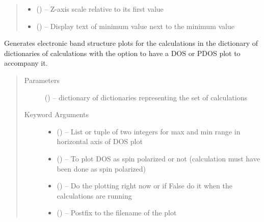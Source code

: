 \documentclass[letterpaper,10pt,english]{sphinxmanual}
\begin{document}
\begin{fulllineitems}
\begin{quote}
\begin{description}
\begin{itemize}
\item {} 
 () -- Z-axis scale relative to its first value

\item {} 
 () -- Display text of minimum value next to the minimum value

\end{itemize}

\end{description}\end{quote}

\end{fulllineitems}


\begin{fulllineitems}
\label{\detokenize{plot:plot.opdos}}
Generates electronic band structure plots for the calculations in the dictionary of dictionaries
of calculations with the option to have a DOS or PDOS plot to accompany it.
\begin{quote}\begin{description}
\item[{Parameters}] \leavevmode
{} () -- dictionary of dictionaries representing the set of calculations

\item[{Keyword Arguments}] \leavevmode\begin{itemize}
\item {} 
 () -- List or tuple of two integers for max and min range in horizontal axis of DOS plot

\item {} 
 () -- To plot DOS as spin polarized or not (calculation must have been done as spin polarized)

\item {} 
 () -- Do the plotting right now or if False do it when the calculations are running

\item {} 
 () -- Postfix to the filename of the plot


\end{itemize}
\end{description}
\end{quote}
\end{fulllineitems}
\end{document}
